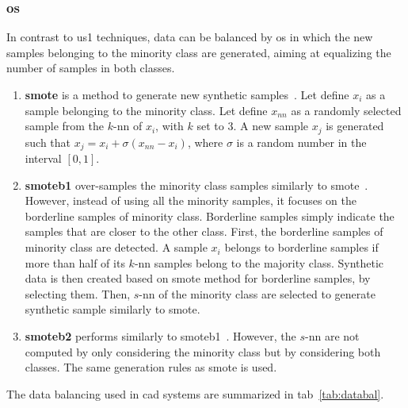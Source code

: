 \subsubsection{\Acl*{os}}
In contrast to \ac{us1} techniques, data can be balanced by \ac{os} in which
the new samples belonging to the minority class are generated, aiming at
equalizing the number of samples in both classes.

\begin{enumerate}[leftmargin=*]

\item[] \textbf{\Ac{smote}} is a method to generate new synthetic
  samples~\cite{chawla2002smote}.
  Let define $x_i$ as a sample belonging to the minority class.
  Let define $x_{nn}$ as a randomly selected sample from the $k$-\ac{nn} of
  $x_i$, with $k$ set to 3.
  A new sample $x_j$ is generated such that $x_j = x_i + \sigma \left( x_{nn} -
    x_i \right)$, where $\sigma$ is a random number in the interval
  $\left[0,1\right]$.

\item[] \textbf{\Ac{smoteb1}} over-samples the minority class samples similarly to
  \ac{smote}~\cite{han2005borderline}.
  However, instead of using all the minority samples, it focuses on the
  borderline samples of minority class.
  Borderline samples simply indicate the samples that are closer to the other
  class.
  First, the borderline samples of minority class are detected.
  A sample $x_{i}$ belongs to borderline samples if more than half of its
  $k$-\ac{nn} samples belong to the majority class.
  Synthetic data is then created based on \ac{smote} method for borderline
  samples, by selecting them.
  Then, $s$-\ac{nn} of the minority class are selected to generate synthetic
  sample similarly to \ac{smote}.

\item[] \textbf{\Ac{smoteb2}} performs similarly to \ac{smoteb1}~\cite{han2005borderline}.
  However, the $s$-\ac{nn} are not computed by only considering the minority
  class but by considering both classes.
  The same generation rules as \ac{smote} is used.

\end{enumerate}

The data balancing used in \ac{cad} systems are summarized in
\acs{tab}~\ref{tab:databal}.

